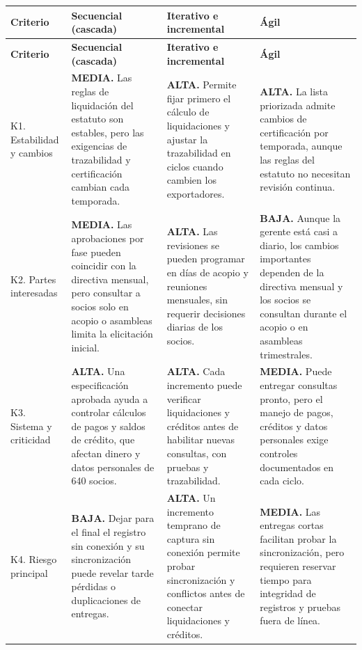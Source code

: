 \documentclass[10pt,letterpaper]{article}
\begin{document}
\begin{longtable}{@{}p{3.15cm}p{7.15cm}p{7.15cm}p{7.15cm}@{}}
\rowcolor{verde}\color{white}\textbf{Criterio}&\color{white}\textbf{Secuencial (cascada)}&\color{white}\textbf{Iterativo e incremental}&\color{white}\textbf{Ágil}\\\endfirsthead
\rowcolor{verde}\color{white}\textbf{Criterio}&\color{white}\textbf{Secuencial (cascada)}&\color{white}\textbf{Iterativo e incremental}&\color{white}\textbf{Ágil}\\\endhead
K1. Estabilidad y cambios&\textbf{MEDIA.} Las reglas de liquidación del estatuto son estables, pero las exigencias de trazabilidad y certificación cambian cada temporada.&\textbf{ALTA.} Permite fijar primero el cálculo de liquidaciones y ajustar la trazabilidad en ciclos cuando cambien los exportadores.&\textbf{ALTA.} La lista priorizada admite cambios de certificación por temporada, aunque las reglas del estatuto no necesitan revisión continua.\\\hline
K2. Partes interesadas&\textbf{MEDIA.} Las aprobaciones por fase pueden coincidir con la directiva mensual, pero consultar a socios solo en acopio o asambleas limita la elicitación inicial.&\textbf{ALTA.} Las revisiones se pueden programar en días de acopio y reuniones mensuales, sin requerir decisiones diarias de los socios.&\textbf{BAJA.} Aunque la gerente está casi a diario, los cambios importantes dependen de la directiva mensual y los socios se consultan durante el acopio o en asambleas trimestrales.\\\hline
K3. Sistema y criticidad&\textbf{ALTA.} Una especificación aprobada ayuda a controlar cálculos de pagos y saldos de crédito, que afectan dinero y datos personales de 640 socios.&\textbf{ALTA.} Cada incremento puede verificar liquidaciones y créditos antes de habilitar nuevas consultas, con pruebas y trazabilidad.&\textbf{MEDIA.} Puede entregar consultas pronto, pero el manejo de pagos, créditos y datos personales exige controles documentados en cada ciclo.\\\hline
K4. Riesgo principal&\textbf{BAJA.} Dejar para el final el registro sin conexión y su sincronización puede revelar tarde pérdidas o duplicaciones de entregas.&\textbf{ALTA.} Un incremento temprano de captura sin conexión permite probar sincronización y conflictos antes de conectar liquidaciones y créditos.&\textbf{MEDIA.} Las entregas cortas facilitan probar la sincronización, pero requieren reservar tiempo para integridad de registros y pruebas fuera de línea.\\\hline

\end{longtable}
\end{document}
